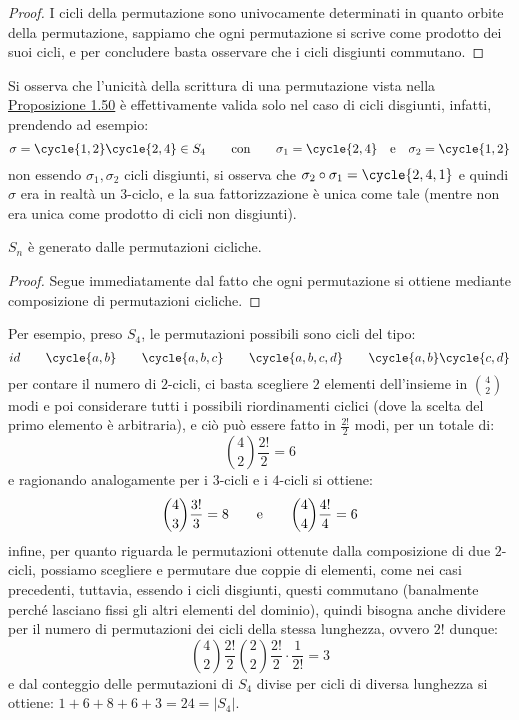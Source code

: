 \documentclass[11pt]{scrartcl}
\begin{document}
\begin{proof}
    I cicli della permutazione sono univocamente determinati in quanto orbite della permutazione, sappiamo che ogni permutazione si scrive come prodotto dei suoi cicli,
    e per concludere basta osservare che i cicli disgiunti commutano.
\end{proof}

\begin{remark}
    Si osserva che l'unicità della scrittura di una permutazione vista nella \hyperref[perm]{Proposizione 1.50} è effettivamente valida solo nel caso di cicli disgiunti, infatti, prendendo ad esempio:
        \[ \sigma = \cycle{1,2}\cycle{2,4} \in S_4 \qquad \text{con}\qquad \sigma_1 = \cycle{2,4} \quad \text e \quad \sigma_2 = \cycle{1,2}
            \]
    non essendo $\sigma_1,\sigma_2$ cicli disgiunti, si osserva che $\sigma_2 \circ \sigma_1 = \cycle{2,4,1}$ e quindi $\sigma$ era in realtà un $3$-ciclo, e la sua fattorizzazione è unica come tale 
    (mentre non era unica come prodotto di cicli non disgiunti). 
\end{remark}

\pagebreak

\begin{corollary}
    $S_n$ è generato dalle permutazioni cicliche.
\end{corollary}

\begin{proof}
    Segue immediatamente dal fatto che ogni permutazione si ottiene mediante composizione di permutazioni cicliche. 
\end{proof}

\begin{example}
    Per esempio, preso $S_4$, le permutazioni possibili sono cicli del tipo:
        \[ id \qquad \cycle{a,b} \qquad \cycle{a,b,c} \qquad \cycle{a,b,c,d} \qquad \cycle{a,b}\cycle{c,d}
            \]
    per contare il numero di $2$-cicli, ci basta scegliere $2$ elementi dell'insieme in $\binom{4}{2}$ modi e poi considerare tutti i possibili 
    riordinamenti ciclici (dove la scelta del primo elemento è arbitraria), e ciò può essere fatto in $\frac{2!}{2}$ modi, per un totale di:
        \[ \binom{4}{2}\frac{2!}{2} = 6
            \]
    e ragionando analogamente per i $3$-cicli e i $4$-cicli si ottiene:
        \[ \binom{4}{3}\frac{3!}{3} = 8 \qquad \text e \qquad \binom{4}{4}\frac{4!}{4} = 6
            \]
    infine, per quanto riguarda le permutazioni ottenute dalla composizione di due $2$-cicli, possiamo scegliere e permutare due coppie di elementi, come 
    nei casi precedenti, tuttavia, essendo i cicli disgiunti, questi commutano (banalmente perché lasciano fissi gli altri elementi del dominio), quindi bisogna anche 
    dividere per il numero di permutazioni dei cicli della stessa lunghezza, ovvero $2!$ dunque:
        \[ \binom{4}{2}\frac{2!}{2}\binom{2}{2}\frac{2!}{2} \cdot \frac{1}{2!} = 3
            \]
    e dal conteggio delle permutazioni di $S_4$ divise per cicli di diversa lunghezza si ottiene: $1+6+8+6+3 = 24 = |S_4|$.
\end{example}
\end{document}
